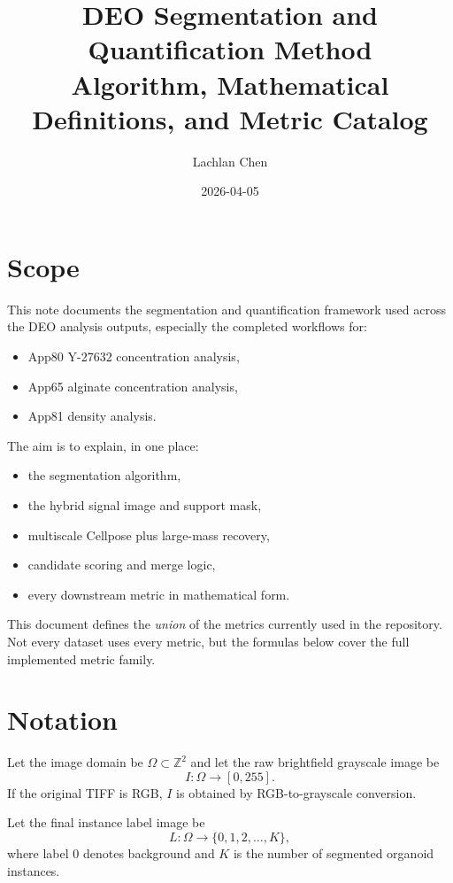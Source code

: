 \documentclass[11pt]{article}
\title{DEO Segmentation and Quantification Method\\Algorithm, Mathematical Definitions, and Metric Catalog}
\author{Lachlan Chen}
\date{2026-04-05}
\newcommand{\1}{\mathbf{1}}
\newcommand{\gray}{I}
\newcommand{\labelmap}{L}
\begin{document}
\maketitle
\tableofcontents

\section{Scope}
This note documents the segmentation and quantification framework used across the DEO analysis outputs, especially the completed workflows for:
\begin{itemize}[leftmargin=1.5em]
  \item App80 Y-27632 concentration analysis,
  \item App65 alginate concentration analysis,
  \item App81 density analysis.
\end{itemize}

The aim is to explain, in one place:
\begin{itemize}[leftmargin=1.5em]
  \item the segmentation algorithm,
  \item the hybrid signal image and support mask,
  \item multiscale Cellpose plus large-mass recovery,
  \item candidate scoring and merge logic,
  \item every downstream metric in mathematical form.
\end{itemize}

This document defines the \emph{union} of the metrics currently used in the repository. Not every dataset uses every metric, but the formulas below cover the full implemented metric family.

\section{Notation}
Let the image domain be $\Omega \subset \mathbb{Z}^2$ and let the raw brightfield grayscale image be
\begin{equation}
\gray: \Omega \to [0,255].
\end{equation}
If the original TIFF is RGB, $\gray$ is obtained by RGB-to-grayscale conversion.

Let the final instance label image be
\begin{equation}
\labelmap: \Omega \to \{0,1,2,\dots,K\},
\end{equation}
where label $0$ denotes background and $K$ is the number of segmented organoid instances.
\end{document}
